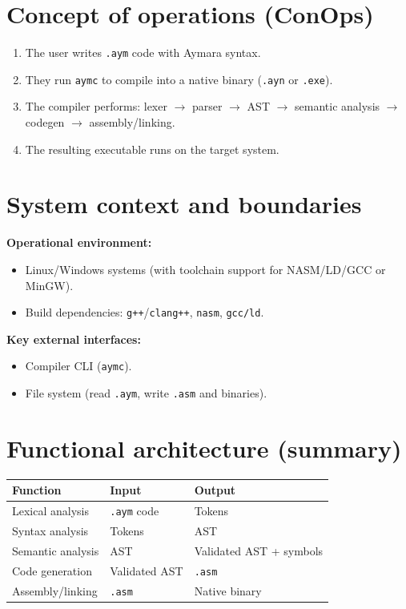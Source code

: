 \documentclass[11pt,a4paper]{article}
\begin{document}
\section{Concept of operations (ConOps)}
\begin{enumerate}
    \item The user writes \texttt{.aym} code with Aymara syntax.
    \item They run \texttt{aymc} to compile into a native binary (\texttt{.ayn} or \texttt{.exe}).
    \item The compiler performs: lexer $\rightarrow$ parser $\rightarrow$ AST $\rightarrow$ semantic analysis $\rightarrow$ codegen $\rightarrow$ assembly/linking.
    \item The resulting executable runs on the target system.
\end{enumerate}

\section{System context and boundaries}
\textbf{Operational environment:}
\begin{itemize}
    \item Linux/Windows systems (with toolchain support for NASM/LD/GCC or MinGW).
    \item Build dependencies: \texttt{g++}/\texttt{clang++}, \texttt{nasm}, \texttt{gcc/ld}.
\end{itemize}

\textbf{Key external interfaces:}
\begin{itemize}
    \item Compiler CLI (\texttt{aymc}).
    \item File system (read \texttt{.aym}, write \texttt{.asm} and binaries).
\end{itemize}

\section{Functional architecture (summary)}
\begin{longtable}{@{}p{4cm}p{5cm}p{5cm}@{}}
\toprule
\textbf{Function} & \textbf{Input} & \textbf{Output} \\ \midrule
Lexical analysis & \texttt{.aym} code & Tokens \\
Syntax analysis & Tokens & AST \\
Semantic analysis & AST & Validated AST + symbols \\
Code generation & Validated AST & \texttt{.asm} \\
Assembly/linking & \texttt{.asm} & Native binary \\
\bottomrule
\end{longtable}
\end{document}
